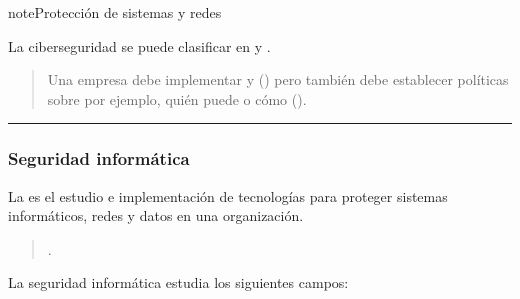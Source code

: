 \documentclass[letterpaper,10pt,spanish]{sphinxmanual}
\begin{document}
\begin{sphinxadmonition}{note}{Protección de sistemas y redes}
\begin{enumerate}
\end{enumerate}

\sphinxAtStartPar
La ciberseguridad se puede clasificar en  y .
\begin{quote}

\sphinxAtStartPar
Una empresa debe implementar  y  () pero también debe establecer políticas sobre por ejemplo, quién puede  o cómo  ().
\end{quote}
\end{sphinxadmonition}


\bigskip\hrule\bigskip



\subsubsection{Seguridad informática}
\label{\detokenize{1_guias/10informatica/G1003:seguridad-informatica}}
\sphinxAtStartPar
La  es el estudio e implementación de tecnologías para proteger sistemas informáticos, redes y datos en una organización.
\begin{quote}

\sphinxAtStartPar
{}.
\end{quote}

\sphinxAtStartPar
La seguridad informática estudia los siguientes campos:
\end{document}
